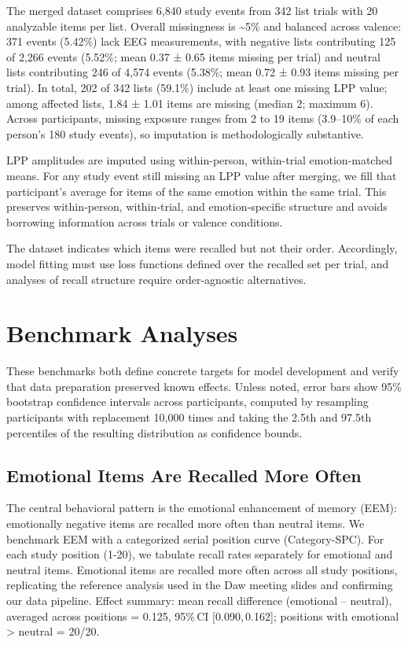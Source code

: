 \documentclass[
  letterpaper,
  DIV=11,
  numbers=noendperiod]{scrartcl}
\begin{document}
The merged dataset comprises 6,840 study events from 342 list trials
with 20 analyzable items per list. Overall missingness is
\textasciitilde5\% and balanced across valence: 371 events (5.42\%) lack
EEG measurements, with negative lists contributing 125 of 2,266 events
(5.52\%; mean 0.37 ± 0.65 items missing per trial) and neutral lists
contributing 246 of 4,574 events (5.38\%; mean 0.72 ± 0.93 items missing
per trial). In total, 202 of 342 lists (59.1\%) include at least one
missing LPP value; among affected lists, 1.84 ± 1.01 items are missing
(median 2; maximum 6). Across participants, missing exposure ranges from
2 to 19 items (3.9--10\% of each person's 180 study events), so
imputation is methodologically substantive.

LPP amplitudes are imputed using within-person, within-trial
emotion‑matched means. For any study event still missing an LPP value
after merging, we fill that participant's average for items of the same
emotion within the same trial. This preserves within‑person,
within‑trial, and emotion‑specific structure and avoids borrowing
information across trials or valence conditions.

The dataset indicates which items were recalled but not their order.
Accordingly, model fitting must use loss functions defined over the
recalled set per trial, and analyses of recall structure require
order‑agnostic alternatives.

\section{Benchmark Analyses}\label{benchmark-analyses}

These benchmarks both define concrete targets for model development and
verify that data preparation preserved known effects. Unless noted,
error bars show 95\% bootstrap confidence intervals across participants,
computed by resampling participants with replacement 10,000 times and
taking the 2.5th and 97.5th percentiles of the resulting distribution as
confidence bounds.

\subsection{Emotional Items Are Recalled More
Often}\label{emotional-items-are-recalled-more-often}

The central behavioral pattern is the emotional enhancement of memory
(EEM): emotionally negative items are recalled more often than neutral
items. We benchmark EEM with a categorized serial position curve
(Category-SPC). For each study position (1-20), we tabulate recall rates
separately for emotional and neutral items. Emotional items are recalled
more often across all study positions, replicating the reference
analysis used in the Daw meeting slides and confirming our data
pipeline. Effect summary: mean recall difference (emotional -- neutral),
averaged across positions = 0.125, 95\%\,CI {[}0.090,\,0.162{]};
positions with emotional \textgreater{} neutral = 20/20.
\end{document}

